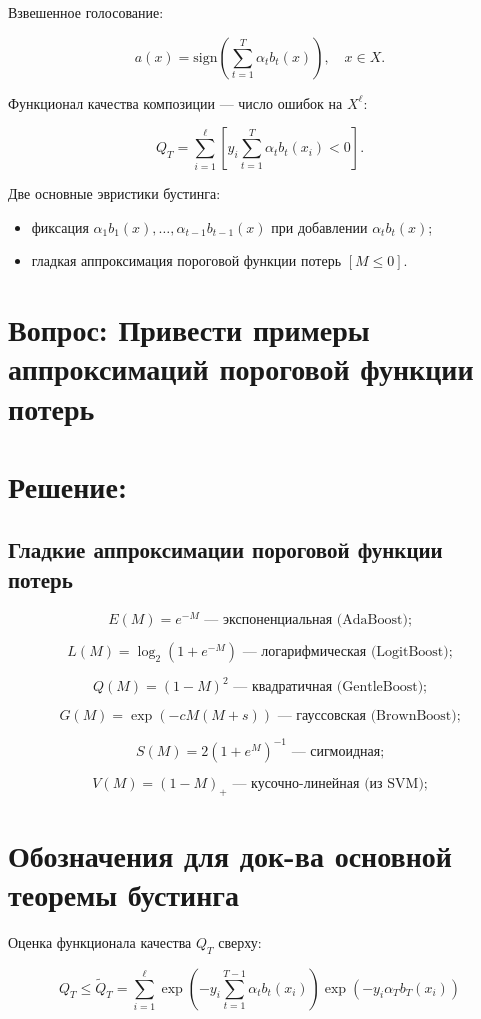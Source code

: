 Взвешенное голосование:

\[
a(x) = \text{sign}\left(\sum_{t=1}^T \alpha_t b_t(x)\right), \quad x \in X.
\]

Функционал качества композиции — число ошибок на \( X^\ell \):

\[
Q_T = \sum_{i=1}^\ell \left[ y_i \sum_{t=1}^T \alpha_t b_t(x_i) < 0 \right].
\]

Две основные эвристики бустинга:
\begin{itemize}
    \item фиксация \(\alpha_1 b_1(x), \ldots, \alpha_{t-1} b_{t-1}(x)\) при добавлении \(\alpha_t b_t(x)\);
    \item гладкая аппроксимация пороговой функции потерь \([M \leq 0]\).
\end{itemize}
\section*{Вопрос: Привести примеры аппроксимаций пороговой функции потерь}
\section*{Решение:}
\subsection*{Гладкие аппроксимации пороговой функции потерь}
\[
E(M) = e^{-M} \text{ — экспоненциальная (AdaBoost);}
\]

\[
L(M) = \log_2(1 + e^{-M}) \text{ — логарифмическая (LogitBoost);}
\]

\[
Q(M) = (1 - M)^2 \text{ — квадратичная (GentleBoost);}
\]

\[
G(M) = \exp\left(-cM(M + s)\right) \text{ — гауссовская (BrownBoost);}
\]

\[
S(M) = 2(1 + e^{M})^{-1} \text{ — сигмоидная;}
\]

\[
V(M) = (1 - M)_+ \text{ — кусочно-линейная (из SVM);}
\]

\section*{Обозначения для док-ва основной теоремы бустинга}

Оценка функционала качества \(Q_T\) сверху:

\[
Q_T \leq \widetilde{Q}_T = \sum_{i=1}^\ell \exp\left(-y_i \sum_{t=1}^{T-1} \alpha_t b_t(x_i)\right) \exp\left(-y_i \alpha_T b_T(x_i)\right)
\]

